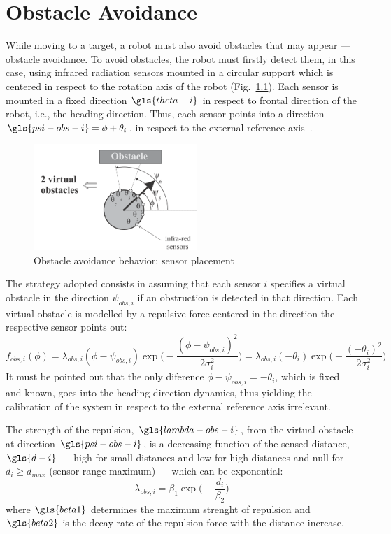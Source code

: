 \chapter{Obstacle Avoidance}%
\label{ch:obstacle-avoidance}
While moving to a target, a robot must also avoid obstacles that may appear ---
obstacle avoidance. To avoid obstacles, the robot must firstly detect them, in
this case, using infrared radiation sensors mounted in a circular support which
is centered in respect to the rotation axis of the robot
(Fig.~\ref{fig:fig2-obs}). Each sensor is mounted in a fixed direction
$\gls{theta-i}$ in respect to frontal direction of the robot, i.e., the heading
direction. Thus, each sensor points into a direction $\gls{psi-obs-i} = \phi + \theta_i$,
in respect to the external reference axis~\cite{bicho2000dynamic}.
%
\begin{figure}[!hbt]
\centering
    \includegraphics[width=0.55\textwidth]{./img/fig2-obstacles.png}
  \caption{Obstacle avoidance behavior: sensor placement}%
\label{fig:fig2-obs}
\end{figure}

The strategy adopted consists in assuming that each sensor $i$ specifies a
virtual obstacle in the direction $\psi_{obs,i}$ if an obstruction is detected
in that direction. Each virtual obstacle is modelled by a repulsive force
centered in the direction the respective sensor points out:
\begin{equation}
  \label{eq:24}
  f_{obs,i}(\phi) = \lambda_{obs,i} (\phi -\psi_{obs,i}) \exp \Big(-\frac{(\phi - \psi_{obs,i})^2}{2 \sigma_i ^2} \Big)
  = \lambda_{obs,i} (- \theta_i) \exp \Big(-\frac{(- \theta_i)^2}{2 \sigma_i ^2} \Big)
\end{equation}
It must be pointed out that the only diference $\phi - \psi_{obs,i} = - \theta_i$,
which is fixed and known, goes into the heading direction dynamics, thus
yielding the calibration of the system in respect to the external reference axis
irrelevant.

The strength of the repulsion, $\gls{lambda-obs-i}$, from the virtual obstacle at
direction $\gls{psi-obs-i}$, is a decreasing function of the sensed distance, $\gls{d-i}$ ---
high for small distances and low for high distances and null for $d_i \ge
d_{max}$ (sensor range maximum) --- which can be exponential:
\begin{equation}
  \label{eq:25}
  \lambda_{obs,i} = \beta_1 \exp \Big( -\frac{d_i}{\beta_2} \Big)
\end{equation}
where $\gls{beta1}$ determines the maximum strenght of repulsion and $\gls{beta2}$ is
the decay rate of the repulsion force with the distance increase.

